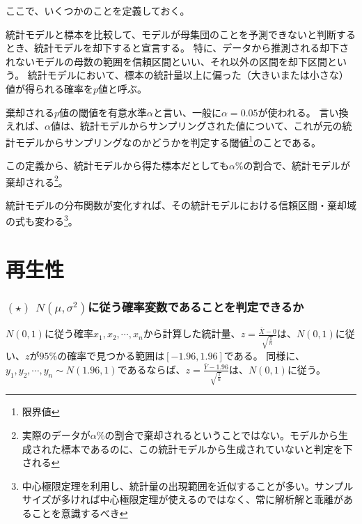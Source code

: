 ここで、いくつかのことを定義しておく。
\begin{defi}
    統計モデルと標本を比較して、モデルが母集団のことを予測できないと判断するとき、統計モデルを却下すると宣言する。
    特に、データから推測される却下されないモデルの母数の範囲を信頼区間といい、それ以外の区間を却下区間という。
    統計モデルにおいて、標本の統計量以上に偏った（大きいまたは小さな）値が得られる確率を$p$値と呼ぶ。

    棄却される$p$値の閾値を有意水準$\alpha$と言い、一般に$\alpha=0.05$が使われる。
    言い換えれば、$\alpha$値は、統計モデルからサンプリングされた値について、これが元の統計モデルからサンプリングなのかどうかを判定する閾値\footnote{限界値}のことである。
    
    この定義から、統計モデルから得た標本だとしても$\alpha \%$の割合で、統計モデルが棄却される\footnote{実際のデータが$\alpha\%$の割合で棄却されるということではない。モデルから生成された標本であるのに、この統計モデルから生成されていないと判定を下される}。

    統計モデルの分布関数が変化すれば、その統計モデルにおける信頼区間・棄却域の式も変わる\footnote{中心極限定理を利用し、統計量の出現範囲を近似することが多い。サンプルサイズが多ければ中心極限定理が使えるのではなく、常に解析解と乖離があることを意識するべき}。
\end{defi}





\section{再生性}
\subsubsection{$(\star)$ $N(\mu,\sigma^2)$に従う確率変数であることを判定できるか}
$N(0,1)$に従う確率$x_1,x_2,\cdots,x_n$から計算した統計量、$z=\frac{\bar{X}-0}{\sqrt{\frac{1}{n}}}$は、$N(0,1)$に従い、$z$が$95\%$の確率で見つかる範囲は$[-1.96,1.96]$である。
同様に、$y_1,y_2,\cdots,y_n \sim N(1.96,1)$であるならば、$z=\frac{\bar{Y}-1.96}{\sqrt{\frac{1}{n}}}$は、$N(0,1)$に従う。

